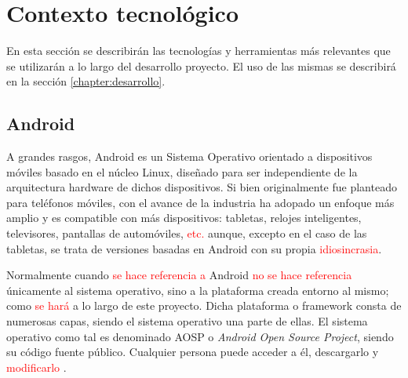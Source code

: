 %
%
%
%




\section{Contexto tecnológico}

    En esta sección se describirán las tecnologías y herramientas más relevantes que se utilizarán a lo
    largo del desarrollo proyecto. El uso de las mismas se describirá en la sección \ref{chapter:desarrollo}.
       
    \subsection{Android}

        A grandes rasgos, Android es un Sistema Operativo orientado a dispositivos móviles basado en el núcleo 
        Linux, diseñado para ser independiente de la arquitectura hardware de dichos dispositivos. 
        Si bien originalmente fue planteado para teléfonos móviles, con el avance de la industria ha adopado 
        un enfoque más amplio y es compatible con más dispositivos: tabletas, relojes inteligentes, televisores, 
        pantallas de automóviles, \textcolor{red}{etc.} %
        aunque, excepto en el caso de las tabletas, se trata de versiones basadas en
        Android con su propia %
        \textcolor{red}{idiosincrasia}. 

        Normalmente cuando \textcolor{red}{se hace referencia a} %
        Android \textcolor{red}{no se hace referencia} %
        únicamente al sistema operativo, sino a la
        plataforma creada entorno al mismo; como \textcolor{red}{se hará} %
        a lo largo de este proyecto. Dicha plataforma o 
        \gls{framework} consta de numerosas capas, siendo el sistema operativo una parte de ellas. El sistema 
        operativo como tal es denominado AOSP o \textit{Android Open Source Project}, siendo su código fuente 
        público. Cualquier persona puede acceder a él, descargarlo y \textcolor{red}{modificarlo} %
        \cite{collado_que_2022}.

